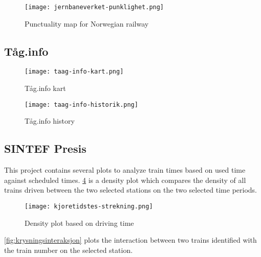 \begin{figure}[!htbp]
	\texttt{[image: jernbaneverket-punklighet.png]}
	\caption[Punctuality map for Norwegian railway]{Punctuality map for Norwegian railway
	\cite{jernbaneverketPunklighetKart}}
	\label{fig:jernbaneverket-punklighet}
\end{figure}
\pagebreak


\subsection{Tåg.info}
\label{subsection:taag.info}



\begin{figure}[!htbp]
	\texttt{[image: taag-info-kart.png]}
	\caption[Tåg.info kart]{Tåg.info kart
	\cite{taagInfo}}
	\label{fig:taag-info-kart}
\end{figure}
\pagebreak

\begin{figure}[!htbp]
	\texttt{[image: taag-info-historik.png]}
	\caption[Tåg.info history]{Tåg.info history
	\cite{taagInfo}}
	\label{fig:taag-info-kart}
\end{figure}
\pagebreak


\subsection{SINTEF Presis}
\label{subsection:sintefPresis}

This project contains several plots to analyze train times based on used time
against scheduled times. \ref{fig:kjoretidstes-strekning} is a density plot
which compares the density of all trains driven between the two selected
stations on the two selected time periods. 


\begin{figure}[!htbp]
	\texttt{[image: kjoretidstes-strekning.png]}
	\caption[Density plot based on driving time]{Density plot based on driving time \cite{sintefPresis}}
	\label{fig:kjoretidstes-strekning}
\end{figure}
\pagebreak

\ref{fig:krysningsinteraksjon} plots the interaction between two trains
identified with the train number on the selected station.

